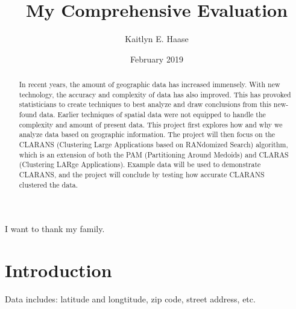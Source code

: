 \documentclass[12pt,twoside]{amherstthesis}
\title{My Comprehensive Evaluation}
\author{Kaitlyn E. Haase}
\date{February 2019}
\begin{document}
      \maketitle
  
  \frontmatter %
  \pagestyle{empty} %

      \begin{acknowledgements}
      I want to thank my family.
    \end{acknowledgements}
  
  

      \hypersetup{linkcolor=black}
    \setcounter{tocdepth}{2}
    \tableofcontents
  
      \listoftables
  
      \listoffigures
  
      \begin{abstract}
      In recent years, the amount of geographic data has increased immensely.
      With new technology, the accuracy and complexity of data has also
      improved. This has provoked statisticians to create techniques to best
      analyze and draw conclusions from this new-found data. Earlier
      techniques of spatial data were not equipped to handle the complexity
      and amount of present data. This project first explores how and why we
      analyze data based on geographic information. The project will then
      focus on the CLARANS (Clustering Large Applications based on RANdomized
      Search) algorithm, which is an extension of both the PAM (Partitioning
      Around Medoids) and CLARAS (Clustering LARge Applications). Example data
      will be used to demonstrate CLARANS, and the project will conclude by
      testing how accurate CLARANS clustered the data.
    \end{abstract}
  
  
  \mainmatter %
  \pagestyle{fancyplain} %

  \onehalfspacing
  
  \chapter*{Introduction}\label{introduction}
  
  Data includes: latitude and longtitude, zip code, street address, etc.
  
\end{document}
